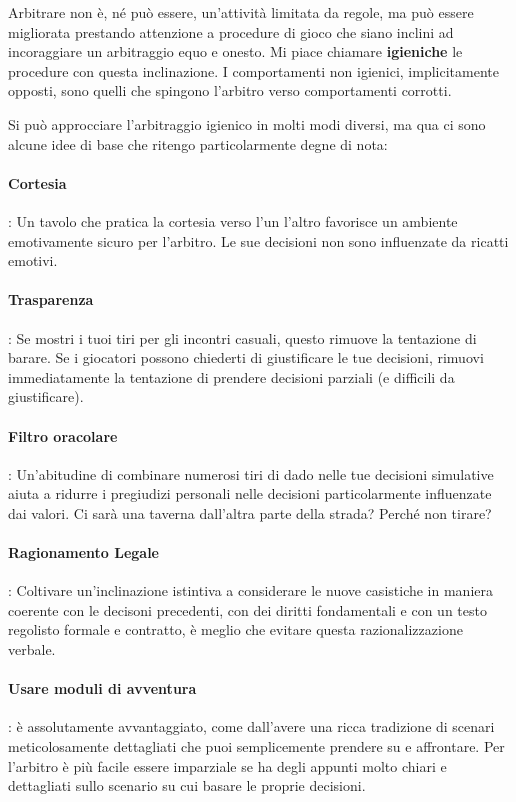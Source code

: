 Arbitrare non è, né può essere, un'attività limitata da regole, ma può essere migliorata prestando attenzione a procedure di gioco che siano inclini ad incoraggiare un arbitraggio equo e onesto. Mi piace chiamare \textbf{igieniche} le procedure con questa inclinazione. I comportamenti non igienici, implicitamente opposti, sono quelli che spingono l'arbitro verso comportamenti corrotti.

Si può approcciare l'arbitraggio igienico in molti modi diversi, ma qua ci sono alcune idee di base che ritengo particolarmente degne di nota:

\paragraph{Cortesia}: Un tavolo che pratica la cortesia verso l'un l'altro favorisce un ambiente emotivamente sicuro per l'arbitro. Le sue decisioni non sono influenzate da ricatti emotivi.

\paragraph{Trasparenza}: Se mostri i tuoi tiri per gli incontri casuali, questo rimuove la tentazione di barare. Se i giocatori possono chiederti di giustificare le tue decisioni, rimuovi immediatamente la tentazione di prendere decisioni parziali (e difficili da giustificare).

\paragraph{Filtro oracolare}: Un'abitudine di combinare numerosi tiri di dado nelle tue decisioni simulative aiuta a ridurre i pregiudizi personali nelle decisioni particolarmente influenzate dai valori. Ci sarà una taverna dall'altra parte della strada? Perché non tirare?

\paragraph{Ragionamento Legale}: Coltivare un'inclinazione istintiva a considerare le nuove casistiche in maniera coerente con le decisoni precedenti, con dei diritti fondamentali e con un testo regolisto formale e contratto, è meglio che evitare questa razionalizzazione verbale.

\paragraph{Usare moduli di avventura}: \dnd{} è assolutamente avvantaggiato, come  dall'avere una ricca tradizione di scenari meticolosamente dettagliati che puoi semplicemente prendere su e affrontare. Per l'arbitro è più facile essere imparziale se ha degli appunti molto chiari e dettagliati sullo scenario su cui basare le proprie decisioni.

